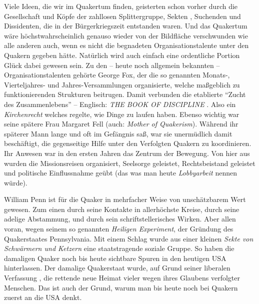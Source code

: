 Viele Ideen, die wir im Quakertum finden, geisterten schon vorher durch die
Gesellschaft und Köpfe der zahllosen Splittergruppe, Sekten
, Suchenden und
Dissidenten, die in der Bürgerkriegszeit
 entstanden waren. Und das Quakertum
wäre höchstwahrscheinlich genauso wieder von der Bildfläche verschwunden wie
alle anderen auch, wenn es nicht die begnadeten Organisationstalente unter den
Quakern gegeben hätte. Natürlich wird auch einfach eine ordentliche Portion
Glück
dabei gewesen sein. Zu den -- heute noch allgemein bekannten --
Organisationstalenten gehörte George Fox, der die so genannten Monats-,
Vierteljahres-
und Jahres-Versammlungen
 organisierte, welche maßgeblich zu
funktionierenden
Strukturen beitrugen. Damit verbunden die etablierte "`Zucht des
Zusammenlebens"'
--
Englisch: \textit{THE BOOK OF DISCIPLINE} . Also ein
\textit{Kirchenrecht} welches
regelte, wie Dinge zu laufen haben. Ebenso wichtig war seine spätere Frau
Margaret Fell (auch: \textit{Mother of
Quakerism}). Während ihr späterer Mann
lange und oft im Gefängnis saß, war sie unermüdlich damit beschäftigt, die
gegenseitige Hilfe unter den Verfolgten Quakern zu
koordinieren. Ihr Anwesen
war in den ersten Jahren das Zentrum der Bewegung. Von hier aus wurden die
Missionsreisen organisiert, Seelsorge geleistet,
Rechtsbeistand geleistet und
politische Einflussnahme geübt (das was man heute
\textit{Lobbyarbeit} nennen
würde).

\medskip

William Penn ist für die Quaker in mehrfacher Weise von unschätzbarem Wert
gewesen.
Zum einen durch seine Kontakte in allerhöchste Kreise, durch seine adelige
Abstammung,
und
durch sein schriftstellerisches Wirken. Aber allen voran, wegen seinem so
genannten \textit{Heiligen Experiment}, der
Gründung des Quakerstaates
Pennsylvania. Mit einem Schlag wurde aus einer kleinen \textit{Sekte von
Schwärmern und Ketzern} eine staatstragende soziale Gruppe. So haben die
damaligen Quaker noch bis heute sichtbare Spuren in den heutigen USA
hinterlassen.
Der damalige Quakerstaat wurde, auf Grund seiner liberalen Verfassung
, die
rettende neue Heimat vieler wegen ihres Glaubens verfolgter Menschen. Das ist
auch der Grund, warum man bis heute noch bei Quakern zuerst an die USA denkt.

